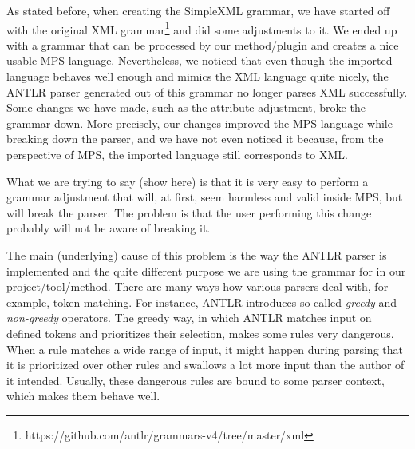 \documentclass[10pt]{sigplanconf}
\begin{document}
As stated before, when creating the SimpleXML grammar, we have started off with the original XML grammar\footnote{https://github.com/antlr/grammars-v4/tree/master/xml} and did some adjustments to it.
We ended up with a grammar that can be processed by our method/plugin and creates a nice usable MPS language.
Nevertheless, we noticed that even though the imported language behaves well enough and mimics the XML language quite nicely, the ANTLR parser generated out of this grammar no longer parses XML successfully.
Some changes we have made, such as the attribute adjustment, broke the grammar down.
More precisely, our changes improved the MPS language while breaking down the parser, and we have not even noticed it because, from the perspective of MPS, the imported language still corresponds to XML.

What we are trying to say (show here) is that it is very easy to perform a grammar adjustment that will, at first, seem harmless and valid inside MPS, but will break the parser.
The problem is that the user performing this change probably will not be aware of breaking it.

The main (underlying) cause of this problem is the way the ANTLR parser is implemented and the quite different purpose we are using the grammar for in our project/tool/method.
There are many ways how various parsers deal with, for example, token matching.
For instance, ANTLR introduces so called \emph{greedy} and \emph{non-greedy} operators.
The greedy way, in which ANTLR matches input on defined tokens and prioritizes their selection, makes some rules very dangerous.
When a rule matches a wide range of input, it might happen during parsing that it is prioritized over other rules and swallows a lot more input than the author of it intended.
Usually, these dangerous rules are bound to some parser context, which makes them behave well.
\end{document}

